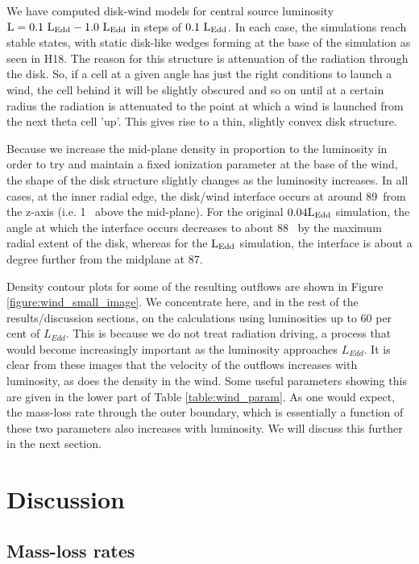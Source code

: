 \documentclass[a4paper,fleqn,usenatbib]{mnras}
\begin{document}
We have computed disk-wind models for central source luminosity 
$\rm{L=0.1~L_{Edd}-1.0~L_{Edd}}$ in steps of $\rm{0.1~L_{Edd}}$. In each case, the simulations reach stable states, 
with static disk-like wedges forming at the base of the simulation as seen in H18. The reason for this
structure is attenuation of the radiation through the disk. So, if a cell at a given angle has just the right
conditions to launch a wind, the cell behind it will be slightly obscured and so on until at a certain radius
the radiation is attenuated to the point at which a wind is launched from the next theta cell 'up'. This gives
rise to a thin, slightly convex disk structure. 

Because we increase the mid-plane density in proportion to the luminosity in order to try and maintain 
a fixed ionization parameter at the base of the wind, the shape of the disk structure slightly changes as
the luminosity increases. In all cases, at the inner radial edge, the disk/wind interface occurs at 
around 89\degree~from the z-axis (i.e. 1\degree~ above the mid-plane). For the original $\rm{0.04L_{Edd}}$ 
simulation, the angle at which the interface occurs decreases to about 88\degree~ by the maximum radial
extent of the disk, whereas for the $\rm{L_{Edd}}$ simulation, the interface is about a degree further from the
midplane at 87\degree.

Density contour plots for some of the resulting outflows are shown in Figure \ref{figure:wind_small_image}.
We concentrate here, and in the rest of the results/discussion sections, on the calculations using luminosities
up to 60 per cent of $L_{Edd}$. This is because we do not treat radiation driving, a process
that would become increasingly important as the luminosity approaches $L_{Edd}$.
It is clear from these images that the velocity of the outflows increases with luminosity, as does the 
density in the wind. Some useful parameters showing this are given in the lower part of Table \ref{table:wind_param}.
As one would expect, the mass-loss rate through the outer boundary, which is essentially a function of these 
two parameters also increases with luminosity. We will discuss this further in the next section.




\section{Discussion}
\label{section:discussion}


\subsection{Mass-loss rates}
\end{document}
